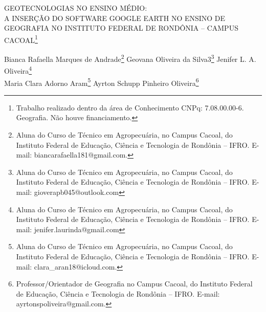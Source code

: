 \documentclass[article,12pt,onesidea,4paper,english,brazil]{abntex2}
\begin{document}
	
	
	\frenchspacing 
	
	\begin{center}
		\LARGE \MakeUppercase{Geotecnologias no Ensino Médio:}\\\MakeUppercase{A inserção do software Google Earth no
	ensino de Geografia no Instituto Federal de Rondônia -- Campus Cacoal}\footnote{Trabalho realizado dentro da área de Conhecimento CNPq: 7.08.00.00-6. Geografia. Não houve
		financiamento.}
		
		\normalsize
	Bianca Rafaella Marques de Andrade\footnote{Aluna do Curso de Técnico em Agropecuária, no Campus Cacoal, do Instituto Federal de Educação,
		Ciência e Tecnologia de Rondônia – IFRO. E-mail: biancarafaella181@gmail.com.} 
	Geovana Oliveira da Silva3\footnote{
		Aluna do Curso de Técnico em Agropecuária, no Campus Cacoal, do Instituto Federal de Educação,
		Ciência e Tecnologia de Rondônia – IFRO. E-mail: gioverapb045@outlook.com}
	Jenifer L. A. Oliveira\footnote{Aluna do Curso de Técnico em Agropecuária, no Campus Cacoal, do Instituto Federal de Educação,
		Ciência e Tecnologia de Rondônia – IFRO. E-mail: jenifer.laurinda@gmail.com} \\
	Maria Clara Adorno Aram\footnote{Aluna do Curso de Técnico em Agropecuária, no Campus Cacoal, do Instituto Federal de Educação,
		Ciência e Tecnologia de Rondônia – IFRO. E-mail: clara\_aran18@icloud.com.} 
	Ayrton Schupp Pinheiro Oliveira\footnote{Professor/Orientador de Geografia no Campus Cacoal, do Instituto Federal de Educação, Ciência e
		Tecnologia de Rondônia – IFRO. E-mail: ayrtonspoliveira@gmail.com.} 
	 
	\end{center}
	
\end{document}
